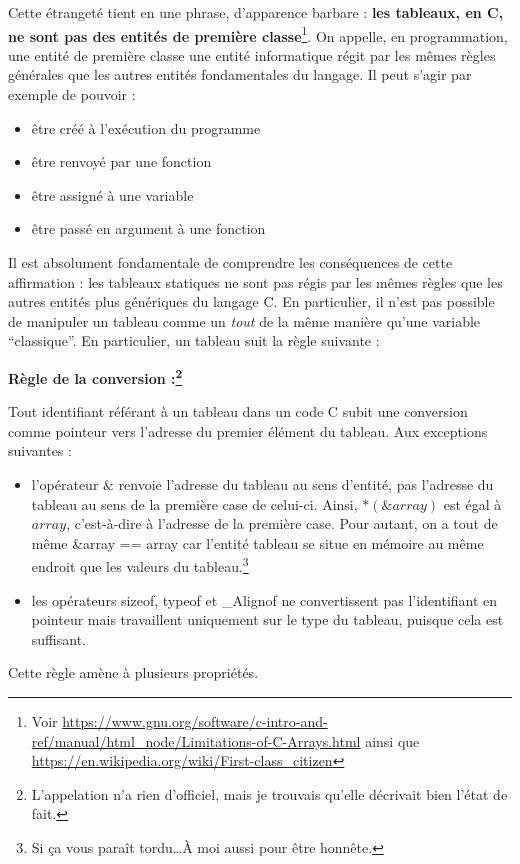 \documentclass[../../../main.tex]{subfiles}
\begin{document}
Cette étrangeté tient en une phrase, d'apparence barbare : \textbf{les tableaux, en C, ne sont pas des entités de première classe}\footnote{Voir \url{https://www.gnu.org/software/c-intro-and-ref/manual/html_node/Limitations-of-C-Arrays.html} ainsi que \url{https://en.wikipedia.org/wiki/First-class_citizen}}. On appelle, en programmation, une entité de première classe une entité informatique régit par les mêmes règles générales que les autres entités fondamentales du langage. Il peut s'agir par exemple de pouvoir :
\begin{itemize}
	\item être créé à l'exécution du programme
	\item être renvoyé par une fonction
	\item être assigné à une variable
	\item être passé en argument à une fonction
\end{itemize} 
Il est absolument fondamentale de comprendre les conséquences de cette affirmation : les tableaux statiques ne sont pas régis par les mêmes règles que les autres entités plus génériques du langage C. En particulier, il n'est pas possible de manipuler un tableau comme un \textit{tout} de la même manière qu'une variable ``classique''. En particulier, un tableau suit la règle suivante :
 
\textbf{Règle de la conversion :\footnote{L'appelation n'a rien d'officiel, mais je trouvais qu'elle décrivait bien l'état de fait.}}
 
Tout identifiant référant à un tableau dans un code C subit une conversion comme pointeur vers l'adresse du premier élément du tableau. Aux exceptions suivantes :
\begin{itemize}
	\item l'opérateur $\&$ renvoie l'adresse du tableau au sens d'entité, pas l'adresse du tableau au sens de la première case de celui-ci. Ainsi, $*(\&array)$ est égal à $array$, c'est-à-dire à l'adresse de la première case. Pour autant, on a tout de même \textsf{\&array == array} car l'entité tableau se situe en mémoire au même endroit que les valeurs du tableau.\footnote{Si ça vous paraît tordu\dots À moi aussi pour être honnête.}
	\item les opérateurs \textsf{sizeof}, \textsf{typeof} et \textsf{\_Alignof} ne convertissent pas l'identifiant en pointeur mais travaillent uniquement sur le type du tableau, puisque cela est suffisant.
\end{itemize}
Cette règle amène à plusieurs propriétés.
\end{document}
